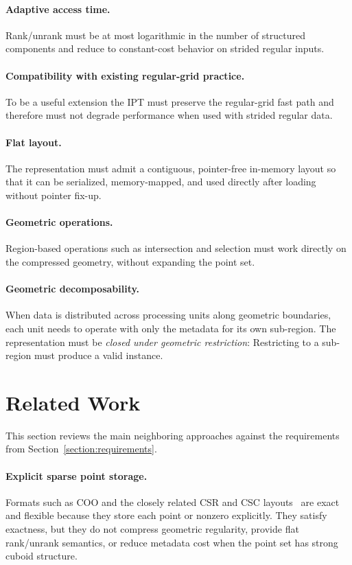 \documentclass[manuscript,screen,review]{acmart}
\theoremstyle{definition}
\theoremstyle{plain}
\begin{document}
\paragraph{Adaptive access time.}
Rank/unrank must be at most logarithmic in the number of structured
components and reduce to constant-cost behavior on strided regular inputs.

\paragraph{Compatibility with existing regular-grid practice.}
To be a useful extension the IPT must preserve the regular-grid fast
path and therefore must not degrade performance when used with strided
regular data.

\paragraph{Flat layout.}
The representation must admit a contiguous, pointer-free in-memory layout so that it can be serialized, memory-mapped, and used directly after loading without pointer fix-up.

\paragraph{Geometric operations.}
Region-based operations such as intersection and selection must work directly on the compressed geometry, without expanding the point set.

\paragraph{Geometric decomposability.}
When data is distributed across processing units along geometric
boundaries, each unit needs to operate with only the metadata for its own sub-region.
The representation must be \emph{closed under geometric restriction}: Restricting to a sub-region must produce a valid instance.

\section{Related Work}
\label{section:existing}

This section reviews the main neighboring approaches against the
requirements from Section~\ref{section:requirements}.

\paragraph{Explicit sparse point storage.}
Formats such as COO and the closely related CSR and CSC
layouts~\cite{Saad2003,Barrett1994} are exact and flexible because
they store each point or nonzero explicitly. They satisfy exactness,
but they do not compress geometric regularity, provide flat
rank/unrank semantics, or reduce metadata cost when the point set has
strong cuboid structure.
\end{document}
